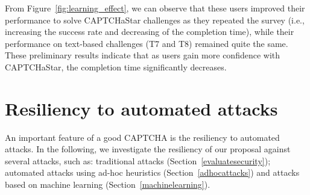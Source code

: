 \documentclass[conference]{IEEEtran}
\newcommand{\topnumbers}{}
\begin{document}
\begin{comment}
\begin{figure}[h!]
\begin{subfigure}{.22\textwidth}
\texttt{[image: learning\_effect\_rate\_new\\topnumbers]}
\caption{Success rate.}
\label{fig:learning_effect_rate}
\end{subfigure}
\hspace{0.1cm}
\begin{subfigure}{.22\textwidth}
\texttt{[image: learning\_effect\_success\_new\\topnumbers]}
\caption{Completion time.}
\label{fig:learning_effect_success}
\end{subfigure}
\vspace{-0.25cm}
\caption{Learning effect on repeating the survey.}
\label{fig:learning_effect}
\end{figure}
\end{comment}

From Figure~\ref{fig:learning_effect}, we can observe that these users improved their performance to solve CAPTCHaStar challenges as they repeated the survey (i.e., increasing the success rate and decreasing of the completion time), while their performance on text-based challenges (T7 and T8) remained quite the same.
These preliminary results indicate that as users gain more confidence with CAPTCHaStar, the completion time significantly decreases.



\section{Resiliency to automated attacks}
\label{evaluateresiliency}
An important feature of a good CAPTCHA is the resiliency to automated attacks.
In the following, we investigate the resiliency of our proposal against several attacks, such as:
traditional attacks (Section~\ref{evaluatesecurity}); automated attacks using ad-hoc heuristics (Section~\ref{adhocattacks}) and attacks based on machine learning (Section~\ref{machinelearning}). 
\end{document}
